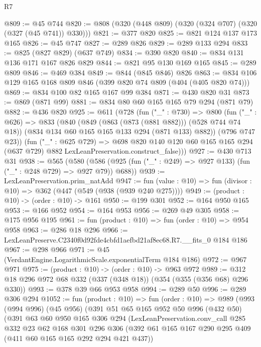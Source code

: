 \begin{lexlean}{R7}
\begin{coremodule}
@809 := @45 @744
@820 := @808 (@320 (@448 @809) (@320 (@324 @707) (@320 (@327 (@45 @741)) @330)))
@821 := @377 @820
@825 := @821 @124 @137 @173 @165
@826 := @45 @747
@827 := @289 @826
@829 := @289 @133 @294
@833 := @825 (@827 @829) (@637 @749)
@834 := @390 @820
@840 := @834 @131 @136 @171 @167 @826 @829
@844 := @821 @95 @130 @169 @165
@845 := @289 @809
@846 := @469 @384
@849 := @844 (@845 @846) @826
@863 := @834 @106 @129 @165 @168 @809 @846 (@399 @820 @74 @809 (@404 (@405 @820 @74)))
@869 := @834 @100 @82 @165 @167 @99 @384
@871 := @430 @820 @31
@873 := @869 (@871 @99)
@881 := @834 @80 @60 @165 @165 @79 @294 (@871 @79)
@882 := @436 @820
@925 := @611
    (@728
      (fun ("_" : @730) =>
      @800
        (fun ("_" : @626) =>
        @833
          (@840
            (@849 (@863 (@873 (@881 @882))) (@528 @744 @74 @18))
            (@834 @134 @60 @165 @165 @133 @294 (@871 @133) @882))
          (@796 @747 @23))
        (fun ("_" : @625 @729) =>
        @698
          @820
          @140
          @120
          @60
          @165
          @165
          @294
          (@637 @729)
          @882
          LexLeanPreservation.construct_false)))
@927 := @430 @713 @31
@938 := @565
    (@580 (@586 (@925 (fun ("_" : @249) => @927 @133) (fun ("_" : @248 @729) => @927 @79)) @688))
@939 := LexLeanPreservation.prim_natAdd
@947 := fun (value : @10) => fun (divisor : @10) => @362 (@447 (@549 (@938 (@939 @240 @275))))
@949 := (product : @10) -> (order : @10) -> @161
@950 := @199 @301
@952 := @164 @950 @165
@953 := @166 @952
@954 := @164 @953
@956 := @269 @49 @305
@958 := @175 @956 @195
@961 := fun (product : @10) => fun (order : @10) => @954 @958
@963 := @286 @18 @296
@966 := LexLeanPreserve.C2340f0d92fde4cbfd1aefbd21af8ec68.R7.__fits_0 @184 @186
@967 := @298 @966
@971 := @45 (VerdantEngine.LogarithmicScale.exponentialTerm @184 @186)
@972 := @967 @971
@975 := (product : @10) -> (order : @10) -> @963 @972
@989 := @312 @18 @296 @972 @68 @332 (@337 (@348 @18)) (@354 (@355 (@356 @68) @296 @330))
@993 := @378 @39 @66 @953 @958
@994 := @289 @50
@996 := @289 @306 @294
@1052 := fun (product : @10) =>
  fun (order : @10) =>
  @989
    (@993
      (@994 @996)
      (@45 @956)
      (@391
        @51
        @65
        @165
        @952
        @50
        @996
        (@432 @50)
        (@391
          @63
          @60
          @950
          @165
          @306
          @294
          (LexLeanPreservation.conv_call
            @285
            @332
            @23
            @62
            @168
            @301
            @296
            @306
            (@392 @61 @165 @167 @290 @295 @409 (@411 @60 @165 @165 @292 @294 @421 @437))

\end{coremodule}
\end{lexlean}
